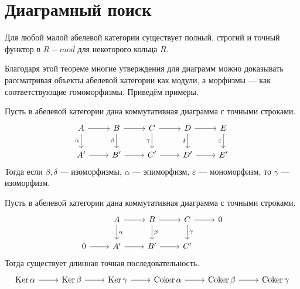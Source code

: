 \documentclass[../main.tex]{subfiles}
\begin{document}
\section{Диаграмный поиск}
\begin{to_thr}
Для любой малой абелевой категории существует полный, строгий и точный функтор в $R-mod$ для некоторого кольца $R$.
\end{to_thr}
Благодаря этой теореме многие утверждения для диаграмм можно доказывать рассматривая объекты абелевой категории как модули, а морфизмы --- как соответствующие гомоморфизмы. Приведём примеры.

\begin{to_suj}\label{B:five_lemma}
Пусть в абелевой категории дана коммутативная диаграмма с точными строками.
\begin{equation*}
    \begin{tikzcd}
	A & B & C & D & E \\
	{A'} & {B'} & {C'} & {D'} & {E'}
	\arrow[from=1-1, to=1-2]
	\arrow[from=1-2, to=1-3]
	\arrow[from=1-3, to=1-4]
	\arrow[from=1-4, to=1-5]
	\arrow[from=2-1, to=2-2]
	\arrow[from=2-2, to=2-3]
	\arrow[from=2-3, to=2-4]
	\arrow[from=2-4, to=2-5]
	\arrow["\alpha"', from=1-1, to=2-1]
	\arrow["\beta"', from=1-2, to=2-2]
	\arrow["\gamma"', from=1-3, to=2-3]
	\arrow["\delta"', from=1-4, to=2-4]
	\arrow["\varepsilon"', from=1-5, to=2-5]
\end{tikzcd}
\end{equation*}
Тогда если $\beta, \delta$ --- изоморфизмы, $\alpha$ --- эпиморфизм, $\varepsilon$ --- мономорфизм, то $\gamma$ --- изоморфизм.
\end{to_suj}

\begin{to_suj}\label{B:snake_lemma}
Пусть в абелевой категории дана коммутативная диаграмма с точными строками.
\begin{equation*}
\begin{tikzcd}
	& A & B & C & 0 \\
	0 & {A'} & {B'} & {C'}
	\arrow[from=1-2, to=1-3]
	\arrow[from=1-3, to=1-4]
	\arrow[from=1-4, to=1-5]
	\arrow[from=2-1, to=2-2]
	\arrow[from=2-2, to=2-3]
	\arrow[from=2-3, to=2-4]
	\arrow["\alpha", from=1-2, to=2-2]
	\arrow["\beta", from=1-3, to=2-3]
	\arrow["\gamma", from=1-4, to=2-4]
\end{tikzcd}
\end{equation*}
Тогда существует длинная точная последовательность.
\begin{equation*}
    \begin{tikzcd}
	\Ker\alpha & \Ker\beta & \Ker\gamma & \coker\alpha & \coker\beta & \coker\gamma
	\arrow[from=1-1, to=1-2]
	\arrow[from=1-2, to=1-3]
	\arrow[from=1-3, to=1-4]
	\arrow[from=1-4, to=1-5]
	\arrow[from=1-5, to=1-6]
\end{tikzcd}
\end{equation*}
\end{to_suj}
\end{document}
